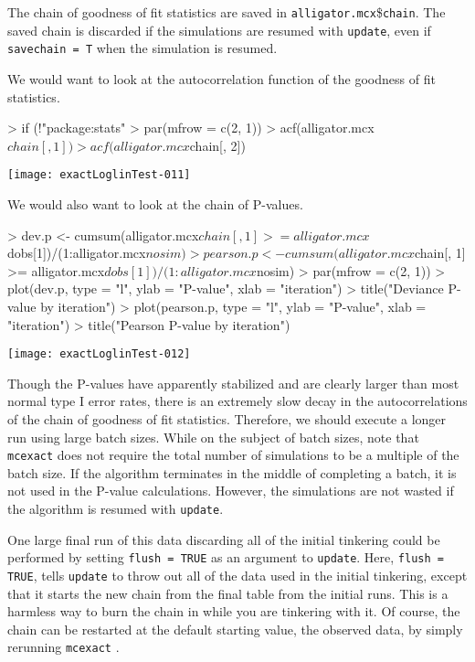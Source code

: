 \documentclass[a4paper]{article}
\newcommand{\mcexact}{\texttt{mcexact} }
\begin{document}
The chain of goodness of fit statistics are saved in
\texttt{alligator.mcx}\$\texttt{chain}. The saved chain is discarded
if the simulations are resumed with \texttt{update}, even if
\texttt{savechain = T} when the simulation is resumed.

We would want to look at the autocorrelation function of the goodness
of fit statistics.
\begin{center}
\begin{Schunk}
\begin{Sinput}
> if (!"package:stats" %in% search()) library(ts)
> par(mfrow = c(2, 1))
> acf(alligator.mcx$chain[, 1])
> acf(alligator.mcx$chain[, 2])
\end{Sinput}
\end{Schunk}
\texttt{[image: exactLoglinTest-011]}
\end{center}
We would also want to look at the chain of P-values. 
\begin{center}
\begin{Schunk}
\begin{Sinput}
> dev.p <- cumsum(alligator.mcx$chain[, 1] >= alligator.mcx$dobs[1])/(1:alligator.mcx$nosim)
> pearson.p <- cumsum(alligator.mcx$chain[, 1] >= alligator.mcx$dobs[1])/(1:alligator.mcx$nosim)
> par(mfrow = c(2, 1))
> plot(dev.p, type = "l", ylab = "P-value", xlab = "iteration")
> title("Deviance P-value by iteration")
> plot(pearson.p, type = "l", ylab = "P-value", xlab = "iteration")
> title("Pearson P-value by iteration")
\end{Sinput}
\end{Schunk}
\texttt{[image: exactLoglinTest-012]}
\end{center}

Though the P-values have apparently stabilized and are clearly larger
than most normal type I error rates, there is an extremely slow decay
in the autocorrelations of the chain of goodness of fit
statistics. Therefore, we should execute a longer run using large
batch sizes. While on the subject of batch sizes, note that \mcexact
does not require the total number of simulations to be a multiple of
the batch size. If the algorithm terminates in the middle of
completing a batch, it is not used in the P-value
calculations. However, the simulations are not wasted if the algorithm
is resumed with \texttt{update}.  

One large final run of this data discarding all of the initial
tinkering could be performed by setting \texttt{flush = TRUE} as an
argument to \texttt{update}.  Here, \texttt{flush = TRUE}, tells
\texttt{update} to throw out all of the data used in the initial
tinkering, except that it starts the new chain from the final table
from the initial runs. This is a harmless way to burn the chain in
while you are tinkering with it.  Of course, the chain can be
restarted at the default starting value, the observed data, by simply
rerunning \mcexact.
\end{document}
